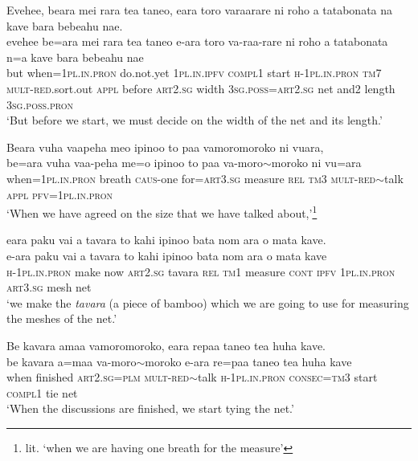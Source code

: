 \ea\label{ex:text20-19}
Evehee, beara mei rara tea taneo, eara toro varaarare ni roho a tatabonata na kave bara bebeahu nae.\\
\gll evehee	be=ara	mei	rara	tea	taneo	e-ara	toro	va-raa-rare	ni	roho	a	tatabonata	n=a	kave	bara	bebeahu	nae\\
     but	when=1\textsc{pl}.\textsc{in}.\textsc{pron}	do.not.yet	1\textsc{pl}.\textsc{in}.\textsc{ipfv}	\textsc{compl}1	start	\textsc{h}-1\textsc{pl}.\textsc{in}.\textsc{pron}	\textsc{tm}7	\textsc{mult}-\textsc{red}.sort.out	\textsc{appl}	before	\textsc{art}2.\textsc{sg}	width	3\textsc{sg}.\textsc{poss}=\textsc{art}2.\textsc{sg}	net	and2	length	3\textsc{sg}.\textsc{poss}.\textsc{pron}\\
\glt `But before we start, we must decide on the width of the net and its length.'
\z

\ea\label{ex:text20-20}
Beara vuha vaapeha meo ipinoo to paa vamoromoroko ni vuara,\\
\gll be=ara	vuha	vaa-peha	me=o	ipinoo	to	paa	va-moro{$\sim$}moroko	ni	vu=ara\\
     when=1\textsc{pl}.\textsc{in}.\textsc{pron}	breath	\textsc{caus}-one	for=\textsc{art}3.\textsc{sg}	measure	\textsc{rel}	\textsc{tm}3	\textsc{mult}-\textsc{red}{$\sim$}talk	\textsc{appl}	\textsc{pfv}=1\textsc{pl}.\textsc{in}.\textsc{pron}\\
\glt `When we have agreed on the size that we have talked about,'\footnote{lit. `when we are having one breath for the measure'}
\z

\ea\label{ex:text20-21}
eara paku vai a tavara to kahi ipinoo bata nom ara o mata kave.\\
\gll e-ara	paku	vai	a	tavara	to	kahi	ipinoo	bata	nom	ara	o	mata	kave\\
     \textsc{h}-1\textsc{pl}.\textsc{in}.\textsc{pron}	make	now	\textsc{art}2.\textsc{sg}	tavara	\textsc{rel}	\textsc{tm}1	measure	\textsc{cont}	\textsc{ipfv}	1\textsc{pl}.\textsc{in}.\textsc{pron}	\textsc{art}3.\textsc{sg}	mesh	net\\
\glt `we make the \textit{tavara} (a piece of bamboo) which we are going to use for measuring the meshes of the net.'
\z

\ea\label{ex:text20-22}
Be kavara amaa vamoromoroko, eara repaa taneo tea huha kave.\\
\gll be	kavara	a=maa	va-moro{$\sim$}moroko	e-ara	re=paa	taneo	tea	huha	kave\\
     when	finished	\textsc{art}2.\textsc{sg}=\textsc{plm}	\textsc{mult}-\textsc{red}{$\sim$}talk	\textsc{h}-1\textsc{pl}.\textsc{in}.\textsc{pron}	\textsc{consec}=\textsc{tm}3	start	\textsc{compl}1	tie	net\\
\glt `When the discussions are finished, we start tying the net.'
\z

